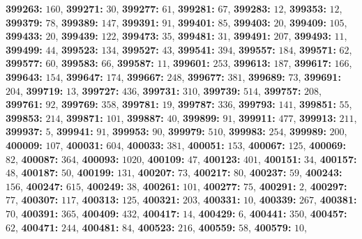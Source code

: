 \textsf{\bfseries 399263:} $160$, \textsf{\bfseries 399271:} $30$, \textsf{\bfseries 399277:} $61$, \textsf{\bfseries 399281:} $67$, \textsf{\bfseries 399283:} $12$, \textsf{\bfseries 399353:} $12$, \textsf{\bfseries 399379:} $78$, \textsf{\bfseries 399389:} $147$, \textsf{\bfseries 399391:} $91$, \textsf{\bfseries 399401:} $85$, \textsf{\bfseries 399403:} $20$, \textsf{\bfseries 399409:} $105$, \textsf{\bfseries 399433:} $20$, \textsf{\bfseries 399439:} $122$, \textsf{\bfseries 399473:} $35$, \textsf{\bfseries 399481:} $31$, \textsf{\bfseries 399491:} $207$, \textsf{\bfseries 399493:} $11$, \textsf{\bfseries 399499:} $44$, \textsf{\bfseries 399523:} $134$, \textsf{\bfseries 399527:} $43$, \textsf{\bfseries 399541:} $394$, \textsf{\bfseries 399557:} $184$, \textsf{\bfseries 399571:} $62$, \textsf{\bfseries 399577:} $60$, \textsf{\bfseries 399583:} $66$, \textsf{\bfseries 399587:} $11$, \textsf{\bfseries 399601:} $253$, \textsf{\bfseries 399613:} $187$, \textsf{\bfseries 399617:} $166$, \textsf{\bfseries 399643:} $154$, \textsf{\bfseries 399647:} $174$, \textsf{\bfseries 399667:} $248$, \textsf{\bfseries 399677:} $381$, \textsf{\bfseries 399689:} $73$, \textsf{\bfseries 399691:} $204$, \textsf{\bfseries 399719:} $13$, \textsf{\bfseries 399727:} $436$, \textsf{\bfseries 399731:} $310$, \textsf{\bfseries 399739:} $514$, \textsf{\bfseries 399757:} $208$, \textsf{\bfseries 399761:} $92$, \textsf{\bfseries 399769:} $358$, \textsf{\bfseries 399781:} $19$, \textsf{\bfseries 399787:} $336$, \textsf{\bfseries 399793:} $141$, \textsf{\bfseries 399851:} $55$, \textsf{\bfseries 399853:} $214$, \textsf{\bfseries 399871:} $101$, \textsf{\bfseries 399887:} $40$, \textsf{\bfseries 399899:} $91$, \textsf{\bfseries 399911:} $477$, \textsf{\bfseries 399913:} $211$, \textsf{\bfseries 399937:} $5$, \textsf{\bfseries 399941:} $91$, \textsf{\bfseries 399953:} $90$, \textsf{\bfseries 399979:} $510$, \textsf{\bfseries 399983:} $254$, \textsf{\bfseries 399989:} $200$, \textsf{\bfseries 400009:} $107$, \textsf{\bfseries 400031:} $604$, \textsf{\bfseries 400033:} $381$, \textsf{\bfseries 400051:} $153$, \textsf{\bfseries 400067:} $125$, \textsf{\bfseries 400069:} $82$, \textsf{\bfseries 400087:} $364$, \textsf{\bfseries 400093:} $1020$, \textsf{\bfseries 400109:} $47$, \textsf{\bfseries 400123:} $401$, \textsf{\bfseries 400151:} $34$, \textsf{\bfseries 400157:} $48$, \textsf{\bfseries 400187:} $50$, \textsf{\bfseries 400199:} $131$, \textsf{\bfseries 400207:} $73$, \textsf{\bfseries 400217:} $80$, \textsf{\bfseries 400237:} $59$, \textsf{\bfseries 400243:} $156$, \textsf{\bfseries 400247:} $615$, \textsf{\bfseries 400249:} $38$, \textsf{\bfseries 400261:} $101$, \textsf{\bfseries 400277:} $75$, \textsf{\bfseries 400291:} $2$, \textsf{\bfseries 400297:} $77$, \textsf{\bfseries 400307:} $117$, \textsf{\bfseries 400313:} $125$, \textsf{\bfseries 400321:} $203$, \textsf{\bfseries 400331:} $10$, \textsf{\bfseries 400339:} $267$, \textsf{\bfseries 400381:} $70$, \textsf{\bfseries 400391:} $365$, \textsf{\bfseries 400409:} $432$, \textsf{\bfseries 400417:} $14$, \textsf{\bfseries 400429:} $6$, \textsf{\bfseries 400441:} $350$, \textsf{\bfseries 400457:} $62$, \textsf{\bfseries 400471:} $244$, \textsf{\bfseries 400481:} $84$, \textsf{\bfseries 400523:} $216$, \textsf{\bfseries 400559:} $58$, \textsf{\bfseries 400579:} $10$, 
